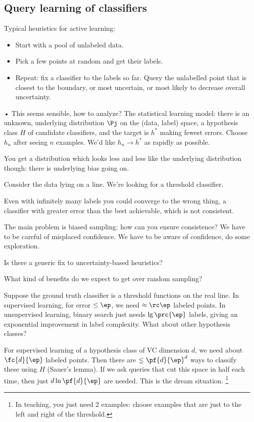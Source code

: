 \subsection{Query learning of classifiers}

Typical heuristics for active learning:
\begin{itemize}
\item
Start with a pool of unlabeled data.
\item
Pick a few points at random and get their labels.
\item
Repeat: fix a classifier to the labels so far. Query the unlabelled point that is closest to the boundary, or most uncertain, or most likely to decrease overall uncertainty.
\end{itemize}•
This seems sensible, how to analyze?
The statistical learning model: there is an unknown, underlying distribution $\Pj$ on the (data, label) space, a hypothesis class $H$ of candidate classifiers, and the target is $h^*$ making fewest errors. Choose $h_n$ after seeing $n$ examples. We'd like $h_n\to h^*$ as rapidly as possible.

You get a distribution which looks less and less like the underlying distribution though: there is underlying bias going on.

Consider the data lying on a line. We're looking for a threshold classifier. 

Even with infinitely many labels you could converge to the wrong thing, a classifier with greater error than the best achievable, which is not consistent.

The main problem is biased sampling: how can you ensure consistence? We have to be careful of misplaced confidence. We have to be aware of confidence, do some exploration. 

Is there a generic fix to uncertainty-based heuristics?

What kind of benefits do we expect to get over random sampling?

Suppose the ground truth classifier is a threshold functions on the real line. 
In supervised learning, for error $\le \ep$, we need $\approx \rc \ep$ labeled points.
In unsupervised learning, binary search just needs $\lg\prc{\ep}$ labels, giving an exponential improvement in label complexity. What about other hypothesis classes?

For supervised learning of a hypothesis class of VC dimension $d$, we need about $\fc{d}{\ep}$ labeled points. Then there are $\le \pf{d}{\ep}^d$ ways to classify these using $H$ (Sauer's lemma). If we ask queries that cut this space in half each time, then just $d\ln \pf{d}{\ep}$ are needed. This is the dream situation. 
%
\footnote{In teaching, you just need 2 examples: choose examples that are just to the left and right of the threshold.}

